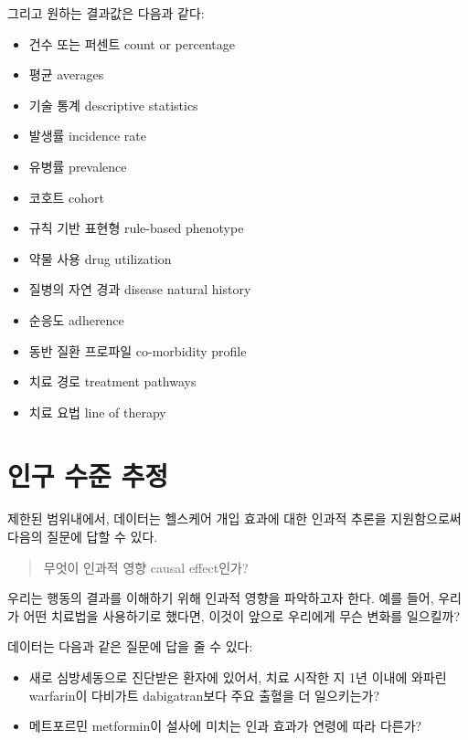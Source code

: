 \documentclass[10.5pt]{book}
\providecommand{\tightlist}{%
  \setlength{\itemsep}{0pt}\setlength{\parskip}{0pt}}
\theoremstyle{definition}
\theoremstyle{definition}
\theoremstyle{definition}
\theoremstyle{remark}
\begin{document}
그리고 원하는 결과값은 다음과 같다:

\begin{itemize}
\tightlist
\item
  건수 또는 퍼센트 count or percentage
\item
  평균 averages
\item
  기술 통계 descriptive statistics
\item
  발생률 incidence rate
\item
  유병률 prevalence
\item
  코호트 cohort
\item
  규칙 기반 표현형 rule-based phenotype
\item
  약물 사용 drug utilization
\item
  질병의 자연 경과 disease natural history
\item
  순응도 adherence
\item
  동반 질환 프로파일 co-morbidity profile
\item
  치료 경로 treatment pathways
\item
  치료 요법 line of therapy
\end{itemize}

\section{인구 수준 추정}\label{--}


제한된 범위내에서, 데이터는 헬스케어 개입 효과에 대한 인과적 추론을
지원함으로써 다음의 질문에 답할 수 있다.

\begin{quote}
무엇이 인과적 영향 causal effect인가?
\end{quote}

우리는 행동의 결과를 이해하기 위해 인과적 영향을 파악하고자 한다. 예를
들어, 우리가 어떤 치료법을 사용하기로 했다면, 이것이 앞으로 우리에게
무슨 변화를 일으킬까?

데이터는 다음과 같은 질문에 답을 줄 수 있다:

\begin{itemize}
\tightlist
\item
  새로 심방세동으로 진단받은 환자에 있어서, 치료 시작한 지 1년 이내에
  와파린 warfarin이 다비가트 dabigatran보다 주요 출혈을 더 일으키는가?
\item
  메트포르민 metformin이 설사에 미치는 인과 효과가 연령에 따라 다른가?
\end{itemize}
\end{document}
